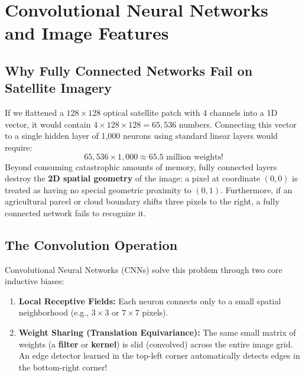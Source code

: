 \chapter{Convolutional Neural Networks and Image Features}
\label{chap:ch05}

\section{Why Fully Connected Networks Fail on Satellite Imagery}
If we flattened a $128 \times 128$ optical satellite patch with 4 channels into a 1D vector, it would contain $4 \times 128 \times 128 = 65{,}536$ numbers. Connecting this vector to a single hidden layer of 1,000 neurons using standard linear layers would require:
\[
65{,}536 \times 1{,}000 \approx 65.5\text{ million weights!}
\]
Beyond consuming catastrophic amounts of memory, fully connected layers destroy the \textbf{2D spatial geometry} of the image: a pixel at coordinate $(0, 0)$ is treated as having no special geometric proximity to $(0, 1)$. Furthermore, if an agricultural parcel or cloud boundary shifts three pixels to the right, a fully connected network fails to recognize it.

\section{The Convolution Operation}
Convolutional Neural Networks (CNNs) solve this problem through two core inductive biases:
\begin{enumerate}
    \item \textbf{Local Receptive Fields:} Each neuron connects only to a small spatial neighborhood (e.g., $3 \times 3$ or $7 \times 7$ pixels).
    \item \textbf{Weight Sharing (Translation Equivariance):} The same small matrix of weights (a \textbf{filter} or \textbf{kernel}) is slid (convolved) across the entire image grid. An edge detector learned in the top-left corner automatically detects edges in the bottom-right corner!
\end{enumerate}

